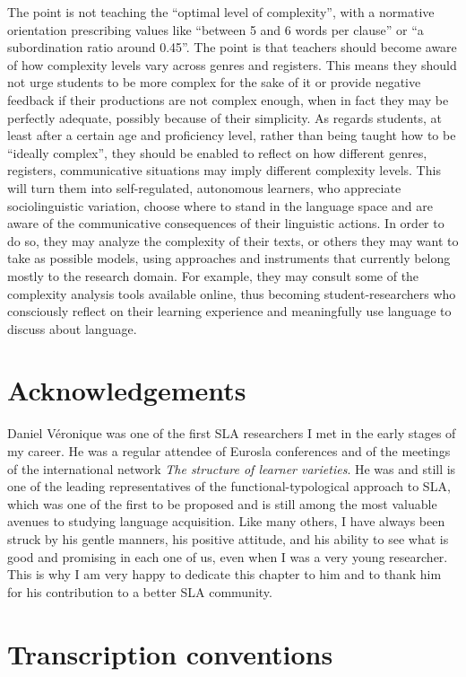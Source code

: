 \documentclass[output=paper]{langscibook}
\begin{document}
The point is not teaching the “optimal level of complexity”, with a normative orientation prescribing values like “between 5 and 6 words per clause” or “a subordination ratio around 0.45”. The point is that teachers should become aware of how complexity levels vary across genres and registers. This means they should not urge students to be more complex for the sake of it or provide negative feedback if their productions are not complex enough, when in fact they may be perfectly adequate, possibly because of their simplicity. As regards students, at least after a certain age and proficiency level, rather than being taught how to be “ideally complex”, they should be enabled to reflect on how different genres, registers, communicative situations may imply different complexity levels. This will turn them into self-regulated, autonomous learners, who appreciate sociolinguistic variation, choose where to stand in the language space and are aware of the communicative consequences of their linguistic actions. In order to do so, they may analyze the complexity of their texts, or others they may want to take as possible models, using approaches and instruments that currently belong mostly to the research domain. For example, they may consult some of the complexity analysis tools available online, thus becoming student-researchers who consciously reflect on their learning experience and meaningfully use language to discuss about language. 

\section*{Acknowledgements}
Daniel Véronique was one of the first SLA researchers I met in the early stages of my career. He was a regular attendee of Eurosla conferences and of the meetings of the international network \textit{The structure of learner varieties}. He was and still is one of the leading representatives of the functional-typological approach to SLA, which was one of the first to be proposed and is still among the most valuable avenues to studying language acquisition. Like many others, I have always been struck by his gentle manners, his positive attitude, and his ability to see what is good and promising in each one of us, even when I was a very young researcher. This is why I am very happy to dedicate this chapter to him and to thank him for his contribution to a better SLA community.

\section*{Transcription conventions}
\end{document}
